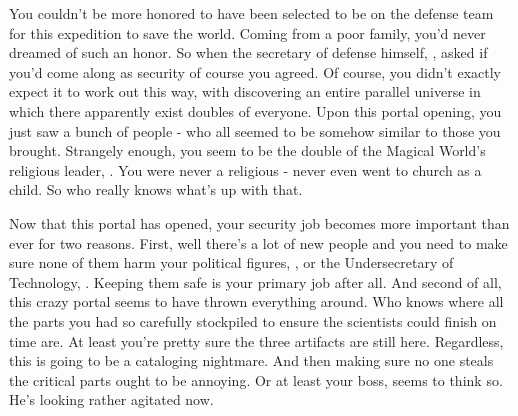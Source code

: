 \documentclass[char]{guildcamp3}
\begin{document}
\name{\cSpecOpTwo{}}

\updatemacro{\cNPC}{
  \unknownplayer %
  }




You couldn't be more honored to have been selected to be on the defense team for this expedition to save the world. Coming from a poor family, you'd never dreamed of such an honor. So when the secretary of defense himself, \cPoliOne{\intro}, asked if you'd come along as security of course you agreed. Of course, you didn't exactly expect it to work out this way, with discovering an entire parallel universe in which there apparently exist doubles of everyone. Upon this portal opening, you just saw a bunch of people - who all seemed to be somehow similar to those you brought. Strangely enough, you seem to be the double of the Magical World's religious leader, \cPaladin{\intro}. You were never a religious \pronoun{\human} - never even went to church as a child. So who really knows what's up with that.

Now that this portal has opened, your security job becomes more important than ever for two reasons. First, well there's a lot of new people and you need to make sure none of them harm your political figures, \cPoliOne{}, or the Undersecretary of Technology, \cPoliTwo{}. Keeping them safe is your primary job after all. And second of all, this crazy portal seems to have thrown everything around. Who knows where all the parts you had so carefully stockpiled to ensure the scientists could finish on time are. At least you're pretty sure the three artifacts are still here. Regardless, this is going to be a cataloging nightmare. And then making sure no one steals the critical parts ought to be annoying. Or at least your boss, \cSpecOpOne{\intro} seems to think so. He's looking rather agitated now. 
\end{document}

